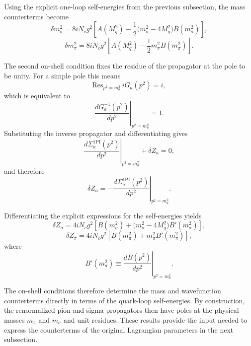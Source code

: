 Using the explicit one-loop self-energies from the previous
subsection, the mass counterterms become
\begin{equation}
\delta m_\sigma^2
=
8 i N_c g^2
\left[
A(M_q^2)
-\frac{1}{2}\bigl(m_\sigma^2-4M_q^2\bigr)B(m_\sigma^2)
\right],
\label{eq:qm_delta_msigma}
\end{equation}
\begin{equation}
\delta m_\pi^2
=
8 i N_c g^2
\left[
A(M_q^2)
-\frac{1}{2}m_\pi^2 B(m_\pi^2)
\right].
\label{eq:qm_delta_mpi}
\end{equation}

The second on-shell condition fixes the residue of the propagator at
the pole to be unity. For a simple pole this means
\begin{equation}
\mathrm{Res}_{p^2=m_a^2}\, iG_a(p^2) = i,
\end{equation}
which is equivalent to
\begin{equation}
\left.
\frac{dG_a^{-1}(p^2)}{dp^2}
\right|_{p^2=m_a^2}
=1.
\label{eq:qm_OS_residue_condition}
\end{equation}
Substituting the inverse propagator and differentiating gives
\begin{equation}
\left.
\frac{d\Sigma_a^{\mathrm{1PI}}(p^2)}{dp^2}
\right|_{p^2=m_a^2}
+
\delta Z_a
=0,
\end{equation}
and therefore
\begin{equation}
\delta Z_a
=
-
\left.
\frac{d\Sigma_a^{\mathrm{1PI}}(p^2)}{dp^2}
\right|_{p^2=m_a^2}.
\label{eq:qm_delta_Z_general}
\end{equation}

Differentiating the explicit expressions for the self-energies yields
\begin{equation}
\delta Z_\sigma
=
4 i N_c g^2
\left[
B(m_\sigma^2)
+
\bigl(m_\sigma^2-4M_q^2\bigr)B'(m_\sigma^2)
\right],
\label{eq:qm_delta_Zsigma}
\end{equation}
\begin{equation}
\delta Z_\pi
=
4 i N_c g^2
\left[
B(m_\pi^2)
+
m_\pi^2 B'(m_\pi^2)
\right],
\label{eq:qm_delta_Zpi}
\end{equation}
where
\begin{equation}
B'(m_a^2)
\equiv
\left.
\frac{dB(p^2)}{dp^2}
\right|_{p^2=m_a^2}.
\end{equation}

The on-shell conditions therefore determine the mass and
wavefunction counterterms directly in terms of the quark-loop
self-energies. By construction, the renormalized pion and sigma
propagators then have poles at the physical masses \(m_\pi\) and
\(m_\sigma\) and unit residues. These results provide the input needed
to express the counterterms of the original Lagrangian parameters in
the next subsection.

